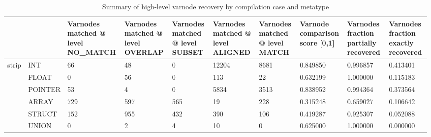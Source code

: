 \begin{table}[t]
\centering
\caption{Summary of high-level varnode recovery by compilation case and metatype}
\label{table:opts-varnodes-summary-metatypes}
\begin{tabular}{lp{2.0cm}p{2.0cm}p{2.0cm}p{2.0cm}p{2.0cm}p{2.0cm}p{2.0cm}p{2.0cm}p{2.0cm}}
\toprule
      &       &  Varnodes matched @ level NO\_MATCH &  Varnodes matched @ level OVERLAP &  Varnodes matched @ level SUBSET &  Varnodes matched @ level ALIGNED &  Varnodes matched @ level MATCH &  Varnode comparison score [0,1] &  Varnodes fraction partially recovered &  Varnodes fraction exactly recovered \\
\midrule
\multirow{6}{*}{strip} & INT &                                 66 &                                48 &                                0 &                             12204 &                            8681 &                        0.849850 &                               0.996857 &                             0.413401 \\
      & FLOAT &                                  0 &                                56 &                                0 &                               113 &                              22 &                        0.632199 &                               1.000000 &                             0.115183 \\
      & POINTER &                                 53 &                                 4 &                                0 &                              5834 &                            3513 &                        0.838952 &                               0.994364 &                             0.373564 \\
      & ARRAY &                                729 &                               597 &                              565 &                                19 &                             228 &                        0.315248 &                               0.659027 &                             0.106642 \\
      & STRUCT &                                152 &                               955 &                              432 &                               390 &                             106 &                        0.419287 &                               0.925307 &                             0.052088 \\
      & UNION &                                  0 &                                 2 &                                4 &                                10 &                               0 &                        0.625000 &                               1.000000 &                             0.000000 \\

\end{tabular}
\end{table}
